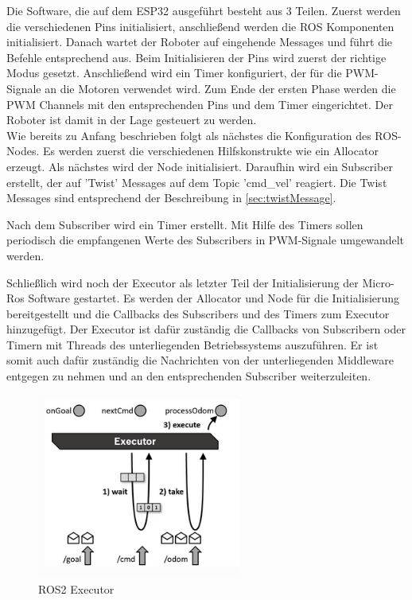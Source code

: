 \begin{flushleft}
    Die Software, die auf dem ESP32 ausgeführt besteht aus 3 Teilen. Zuerst werden die verschiedenen Pins initialisiert, anschließend werden die ROS Komponenten initialisiert. Danach wartet der Roboter auf eingehende Messages und führt die Befehle entsprechend aus.
    Beim Initialisieren der Pins wird zuerst der richtige Modus gesetzt. Anschließend wird ein Timer konfiguriert, der für die PWM-Signale an die Motoren verwendet wird.
    Zum Ende der ersten Phase werden die PWM Channels mit den entsprechenden Pins und dem Timer eingerichtet.
    Der Roboter ist damit in der Lage gesteuert zu werden.\\

    Wie bereits zu Anfang beschrieben folgt als nächstes die Konfiguration des ROS-Nodes.
    Es werden zuerst die verschiedenen Hilfskonstrukte wie ein Allocator erzeugt. Als nächstes wird der Node initialisiert.
    Daraufhin wird ein Subscriber erstellt, der auf 'Twist' Messages auf dem Topic 'cmd\_vel' reagiert. 
    Die Twist Messages sind entsprechend der Beschreibung in \ref{sec:twistMessage}. \newline


    Nach dem Subscriber wird ein Timer erstellt. Mit Hilfe des Timers sollen periodisch die empfangenen Werte des Subscribers in PWM-Signale umgewandelt werden.
    
    Schließlich wird noch der Executor als letzter Teil der Initialisierung der Micro-Ros Software gestartet.
    Es werden der Allocator und Node für die Initialisierung bereitgestellt und die Callbacks des Subscribers und des Timers zum Executor hinzugefügt.
    Der Executor ist dafür zuständig die Callbacks von Subscribern oder Timern mit Threads des unterliegenden Betriebssystems auszuführen.
    Er ist somit auch dafür zuständig die Nachrichten von der unterliegenden Middleware entgegen zu nehmen und an den entsprechenden Subscriber weiterzuleiten.\\

    \begin{figure}[h!]
        \centering
        \includegraphics[width=0.6\textwidth]{imgs/ROS2_executor.png}
        \caption{ROS2 Executor}
        \label{fig:ros2_executor}%
    \end{figure}


\end{flushleft}
